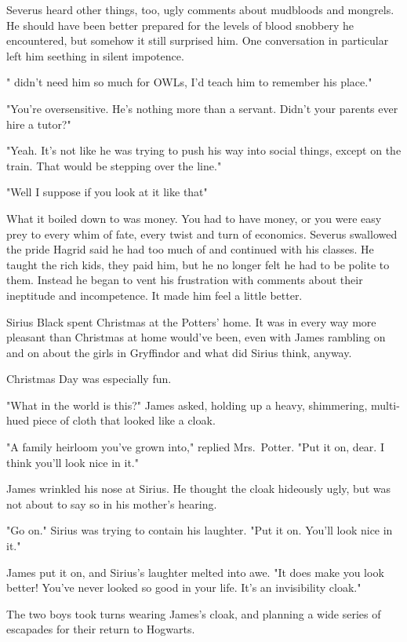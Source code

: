 Severus heard other things, too, ugly comments about mudbloods and mongrels. He should have been better prepared for the levels of blood snobbery he encountered, but somehow it still surprised him. One conversation in particular left him seething in silent impotence.

"{\el} didn't need him so much for OWLs, I'd teach him to remember his place."

"You're oversensitive. He's nothing more than a servant. Didn't your parents ever hire a tutor?"

"Yeah. It's not like he was trying to push his way into social things, except on the train. That would be stepping over the line."

"Well I suppose if you look at it like that{\el}"

What it boiled down to was money. You had to have money, or you were easy prey to every whim of fate, every twist and turn of economics. Severus swallowed the pride Hagrid said he had too much of and continued with his classes. He taught the rich kids, they paid him, but he no longer felt he had to be polite to them. Instead he began to vent his frustration with comments about their ineptitude and incompetence. It made him feel a little better.

Sirius Black spent Christmas at the Potters' home. It was in every way more pleasant than Christmas at home would've been, even with James rambling on and on about the girls in Gryffindor and what did Sirius think, anyway.

Christmas Day was especially fun.

"What in the world is this?" James asked, holding up a heavy, shimmering, multi-hued piece of cloth that looked like a cloak.

"A family heirloom you've grown into," replied Mrs.~Potter. "Put it on, dear. I think you'll look nice in it."

James wrinkled his nose at Sirius. He thought the cloak hideously ugly, but was not about to say so in his mother's hearing.

"Go on." Sirius was trying to contain his laughter. "Put it on. You'll look nice in it."

James put it on, and Sirius's laughter melted into awe. "It does make you look better! You've never looked so good in your life. It's an invisibility cloak."

The two boys took turns wearing James's cloak, and planning a wide series of escapades for their return to Hogwarts.

